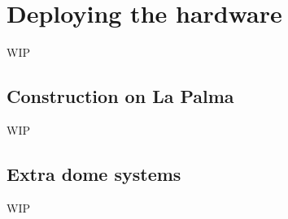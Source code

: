 
\newpage
\section{Deploying the hardware}
\label{sec:hardware}
\begin{colsection}


\begin{colsection}

WIP

\end{colsection}


\subsection{Construction on La Palma}
\label{sec:construction}
\begin{colsection}

WIP

\end{colsection}


\subsection{Extra dome systems}
\label{sec:arduino}
\begin{colsection}

WIP

\end{colsection}


\end{colsection}


\newpage
